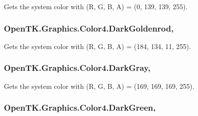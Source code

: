 Gets the system color with (R, G, B, A) = (0, 139, 139, 255). 

\hypertarget{struct_open_t_k_1_1_graphics_1_1_color4_aac47950953635b78230a46521766ce83}{
\subsubsection[{Dark\-Goldenrod}]{ Open\-T\-K.\-Graphics.\-Color4.\-Dark\-Goldenrod\hspace{0.3cm}{\ttfamily [static]}, {\ttfamily [get]}}}\label{struct_open_t_k_1_1_graphics_1_1_color4_aac47950953635b78230a46521766ce83}


Gets the system color with (R, G, B, A) = (184, 134, 11, 255). 

\hypertarget{struct_open_t_k_1_1_graphics_1_1_color4_a19d89bee4a7cdb5113c5d82a578f82b9}{
\subsubsection[{Dark\-Gray}]{ Open\-T\-K.\-Graphics.\-Color4.\-Dark\-Gray\hspace{0.3cm}{\ttfamily [static]}, {\ttfamily [get]}}}\label{struct_open_t_k_1_1_graphics_1_1_color4_a19d89bee4a7cdb5113c5d82a578f82b9}


Gets the system color with (R, G, B, A) = (169, 169, 169, 255). 

\hypertarget{struct_open_t_k_1_1_graphics_1_1_color4_aadb9a7f4e36747693597d4c160b8e19a}{
\subsubsection[{Dark\-Green}]{ Open\-T\-K.\-Graphics.\-Color4.\-Dark\-Green\hspace{0.3cm}{\ttfamily [static]}, {\ttfamily [get]}}}\label{struct_open_t_k_1_1_graphics_1_1_color4_aadb9a7f4e36747693597d4c160b8e19a}


